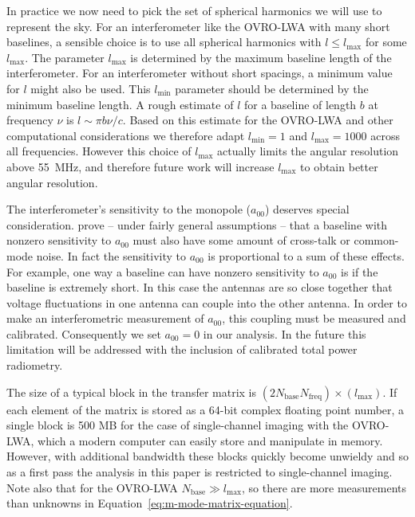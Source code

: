 \documentclass[twocolumn]{aastex61}
\begin{document}
In practice we now need to pick the set of spherical harmonics we will use to represent the sky. For
an interferometer like the OVRO-LWA with many short baselines, a sensible choice is to use all
spherical harmonics with $l\le l_\text{max}$ for some $l_\text{max}$. The parameter $l_\text{max}$
is determined by the maximum baseline length of the interferometer.  For an interferometer without
short spacings, a minimum value for $l$ might also be used. This $l_\text{min}$ parameter should be
determined by the minimum baseline length. A rough estimate of $l$ for a baseline of length $b$ at
frequency $\nu$ is $l \sim \pi b\nu/c$. Based on this estimate for the OVRO-LWA and other
computational considerations we therefore adapt $l_\text{min}=1$ and $l_\text{max}=1000$ across all
frequencies. However this choice of $l_\text{max}$ actually limits the angular resolution above
55~MHz, and therefore future work will increase $l_\text{max}$ to obtain better angular resolution.

The interferometer's sensitivity to the monopole ($a_{00}$) deserves special consideration.
\citet{2016ApJ...826..116V} prove -- under fairly general assumptions -- that a baseline with
nonzero sensitivity to $a_{00}$ must also have some amount of cross-talk or common-mode noise.  In
fact the sensitivity to $a_{00}$ is proportional to a sum of these effects. For example, one way a
baseline can have nonzero sensitivity to $a_{00}$ is if the baseline is extremely short. In this
case the antennas are so close together that voltage fluctuations in one antenna can couple into the
other antenna. In order to make an interferometric measurement of $a_{00}$, this coupling must be
measured and calibrated. Consequently we set $a_{00}=0$ in our analysis. In the future this
limitation will be addressed with the inclusion of calibrated total power radiometry.

The size of a typical block in the transfer matrix is
$(2N_\text{base}N_\text{freq})\times(l_\text{max})$. If each element of the matrix is stored as a
64-bit complex floating point number, a single block is 500 MB for the case of single-channel
imaging with the OVRO-LWA, which a modern computer can easily store and manipulate in memory.
However, with additional bandwidth these blocks quickly become unwieldy and so as a first pass the
analysis in this paper is restricted to single-channel imaging. Note also that for the OVRO-LWA
$N_\text{base} \gg l_\text{max}$, so there are more measurements than unknowns in
Equation~\ref{eq:m-mode-matrix-equation}.
\end{document}
